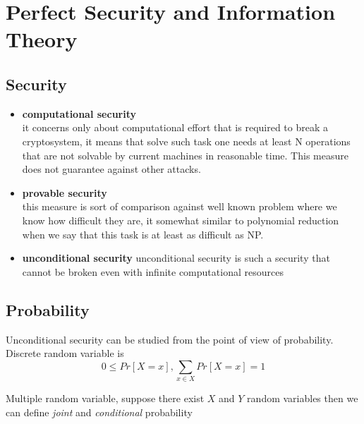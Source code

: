 \documentclass[a4paper,10pt]{article}
\begin{document}
\section*{Perfect Security and Information Theory}
\subsection{Security}
\begin{itemize}
\item \textbf{computational security}\\ it concerns only about computational effort that is required to break a cryptosystem, it means that solve such task one needs at least N operations that are not solvable by current machines in reasonable time. This measure does not guarantee against other attacks.
\item \textbf{provable security}\\
this measure is sort of comparison against well known problem where we know how difficult they are, it somewhat similar to polynomial reduction when we say that this task is at least as difficult as NP.
\item \textbf{unconditional security}
unconditional security is such a security that cannot be broken even with infinite computational resources
\end{itemize}
\subsection*{Probability}
Unconditional security can be studied from the point of view of probability.
Discrete random variable is
$$
0 \leq Pr[X=x], \sum_{x \in X} Pr[X=x] = 1
$$

Multiple random variable, suppose there exist $X$ and $Y$ random variables then we can define \textit{joint} and \textit{conditional} probability
\end{document}
